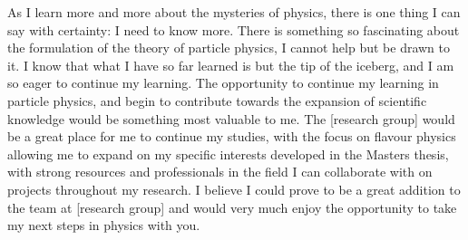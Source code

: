 \documentclass[11pt, a4paper]{awesome-cv}
\begin{document}
\begin{cvletter}
As I learn more and more about the mysteries of physics, there is one thing I can say with certainty: I need to know more. 
There is something so fascinating about the formulation of the theory of particle physics, I cannot help but be drawn to it. 
I know that what I have so far learned is but the tip of the iceberg, and I am so eager to continue my learning. 
The opportunity to continue my learning in particle physics, and begin to contribute towards the expansion of scientific knowledge would be something most valuable to me. 
The [research group] would be a great place for me to continue my studies, with the focus on flavour physics allowing me to expand on my specific interests developed in the Masters thesis, with strong resources and professionals in the field I can collaborate with on projects throughout my research.
I believe I could prove to be a great addition to the team at [research group] and would very much enjoy the opportunity to take my next steps in physics with you. 

\end{cvletter}


\makeletterclosing
\end{document}
